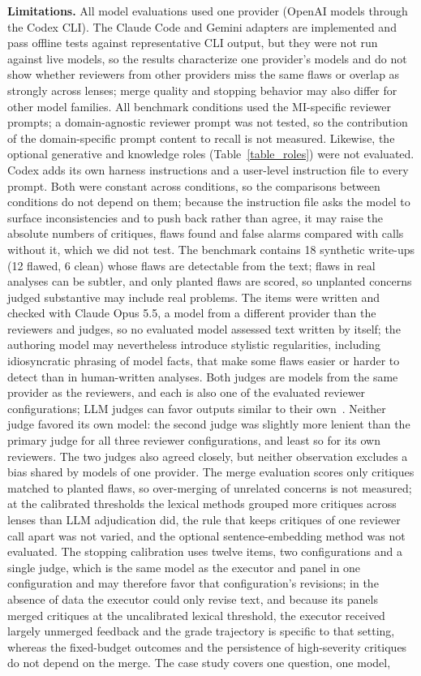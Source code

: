 \documentclass[10pt,letterpaper]{article}
\begin{document}
\textbf{Limitations.} All model evaluations used one provider (OpenAI models through the Codex CLI). The Claude Code and Gemini adapters are implemented and pass offline tests against representative CLI output, but they were not run against live models, so the results characterize one provider's models and do not show whether reviewers from other providers miss the same flaws or overlap as strongly across lenses; merge quality and stopping behavior may also differ for other model families. All benchmark conditions used the MI-specific reviewer prompts; a domain-agnostic reviewer prompt was not tested, so the contribution of the domain-specific prompt content to recall is not measured. Likewise, the optional generative and knowledge roles (Table~\ref{table_roles}) were not evaluated. Codex adds its own harness instructions and a user-level instruction file to every prompt. Both were constant across conditions, so the comparisons between conditions do not depend on them; because the instruction file asks the model to surface inconsistencies and to push back rather than agree, it may raise the absolute numbers of critiques, flaws found and false alarms compared with calls without it, which we did not test. The benchmark contains 18 synthetic write-ups (12 flawed, 6 clean) whose flaws are detectable from the text; flaws in real analyses can be subtler, and only planted flaws are scored, so unplanted concerns judged substantive may include real problems. The items were written and checked with Claude Opus 5.5, a model from a different provider than the reviewers and judges, so no evaluated model assessed text written by itself; the authoring model may nevertheless introduce stylistic regularities, including idiosyncratic phrasing of model facts, that make some flaws easier or harder to detect than in human-written analyses. Both judges are models from the same provider as the reviewers, and each is also one of the evaluated reviewer configurations; LLM judges can favor outputs similar to their own~\cite{zheng2023judging,wang2024fair}. Neither judge favored its own model: the second judge was slightly more lenient than the primary judge for all three reviewer configurations, and least so for its own reviewers. The two judges also agreed closely, but neither observation excludes a bias shared by models of one provider. The merge evaluation scores only critiques matched to planted flaws, so over-merging of unrelated concerns is not measured; at the calibrated thresholds the lexical methods grouped more critiques across lenses than LLM adjudication did, the rule that keeps critiques of one reviewer call apart was not varied, and the optional sentence-embedding method was not evaluated. The stopping calibration uses twelve items, two configurations and a single judge, which is the same model as the executor and panel in one configuration and may therefore favor that configuration's revisions; in the absence of data the executor could only revise text, and because its panels merged critiques at the uncalibrated lexical threshold, the executor received largely unmerged feedback and the grade trajectory is specific to that setting, whereas the fixed-budget outcomes and the persistence of high-severity critiques do not depend on the merge. The case study covers one question, one model, 
\end{document}
